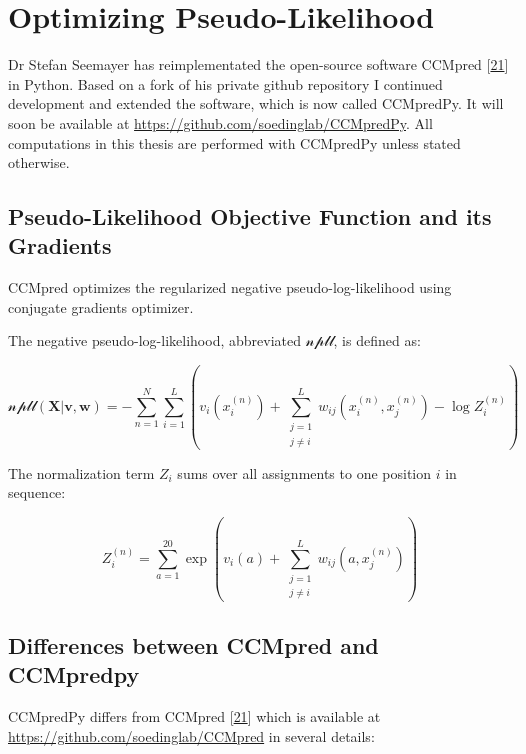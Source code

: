 \documentclass[12pt,a4paper,twoside]{book}
\renewcommand{\v}{\mathbf{v}}
\newcommand{\w}{\mathbf{w}}
\theoremstyle{definition}
\theoremstyle{definition}
\theoremstyle{remark}
\begin{document}
\section{Optimizing
Pseudo-Likelihood}\label{optimizing-pseudo-likelihood}

Dr Stefan Seemayer has reimplementated the open-source software CCMpred
{[}\protect\hyperlink{ref-Seemayer2014}{21}{]} in Python. Based on a
fork of his private github repository I continued development and
extended the software, which is now called CCMpredPy. It will soon be
available at \url{https://github.com/soedinglab/CCMpredPy}. All
computations in this thesis are performed with CCMpredPy unless stated
otherwise.

\subsection{Pseudo-Likelihood Objective Function and its
Gradients}\label{pseudo-likelihood-objective-function-and-its-gradients}

CCMpred optimizes the regularized negative pseudo-log-likelihood using
conjugate gradients optimizer.

The negative pseudo-log-likelihood, abbreviated \(\mathcal{npll}\), is
defined as:

\begin{equation}
  \mathcal{npll}(\mathbf{X} | \v,\w) =   - \sum_{n=1}^N \sum_{i=1}^L  \left(  v_i(x_i^{(n)}) + \sum_{\substack{j=1 \\ j \neq i}}^L w_{ij}(x_i^{(n)}, x_j^{(n)})  - \log Z_i^{(n)} \right)
\end{equation}

The normalization term \(Z_i\) sums over all assignments to one position
\(i\) in sequence:

\begin{equation}
  Z_i^{(n)} = \sum_{a=1}^{20} \exp \left( v_i(a) + \sum_{\substack{j=1 \\ j \neq i}}^L w_{ij}(a, x_j^{(n)}) \right)
\end{equation}

\subsection{Differences between CCMpred and
CCMpredpy}\label{diff-ccmpred-ccmpredpy}

CCMpredPy differs from CCMpred
{[}\protect\hyperlink{ref-Seemayer2014}{21}{]} which is available at
\url{https://github.com/soedinglab/CCMpred} in several details:
\end{document}
